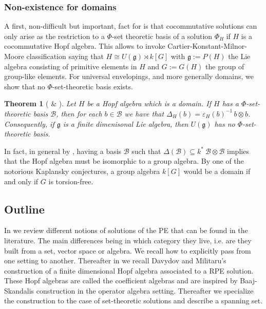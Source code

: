 \documentclass[a4paper,10pt]{amsart}
\newtheorem{maintheorem}{Theorem}
\theoremstyle{definition}
\theoremstyle{remark}
\newcommand\D{\Delta}
\newcommand\eps{\varepsilon}
\newcommand\ot{\otimes}
\newcommand\mc{\mathcal}
\begin{document}
\subsubsection*{Non-existence for domains}

A first, non-difficult but important, fact for  is that cocommutative solutions can only arise as the restriction to a $\Phi$-set theoretic basis of a solution $\Phi_H$ if $H$ is a cocommutative Hopf algebra. This allows to invoke Cartier-Konstant-Milnor-Moore classification saying that $H \cong U(\mathfrak{g}) \rtimes k[G]$ with $\mathfrak{g} := P(H)$ the Lie algebra consisting of primitive elements in $H$ and $G := G(H)$ the group of group-like elements. For universal envelopings, and more generally domains, we show that no $\Phi$-set-theoretic basis exists.

\begin{maintheorem}[ \& ]
Let $H$ be a Hopf algebra which is a domain. If $H$ has a $\Phi$-set-theoretic basis $\mc{B}$, then for each $b \in \mc{B}$ we have that $\D_H(b) = \eps_H(b)^{-1}\,  b \otimes b$. Consequently, if $\mathfrak{g}$ is a finite dimenisonal Lie algebra, then $U(\mathfrak{g})$ has no $\Phi$-set-theoretic basis.
\end{maintheorem} 

In fact, in general by , having a basis $\mc{B}$ such that $\D(\mc{B}) \subseteq k^* \ \mc{B} \ot \mc{B}$  implies that the Hopf algebra must be isomorphic to a group algebra. By one of the notorious Kaplansky conjectures, a group algebra $k[G]$ would be a domain if and only if $G$ is torsion-free.

\subsection{Outline}\label{subsec:outline}

In  we review different notions of solutions of the PE that can be found in the literature. The main differences being in which category they live, i.e. are they built from a set, vector space or algebra. We recall how to explicitly pass from one setting to another. Thereafter in  we recall Davydov \cite{Dav} and Militaru's \cite{Mi04} construction of a finite dimensional Hopf algebra associated to a RPE solution. These Hopf algebras are called the coefficient algebras and are inspired by Baaj-Skandalis construction \cite{BaSk93} in the operator algebra setting. Thereafter we specialize the construction to the case of set-theoretic solutions and describe a spanning set.
\end{document}
